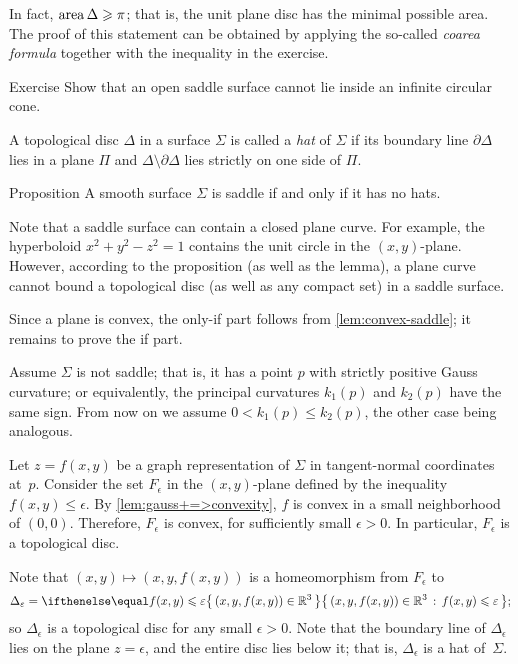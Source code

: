 In fact, $\mathop{\rm area}\nolimits \Delta\geqslant \pi$;
that is, the unit plane disc has the minimal possible area.
The proof of this statement can be obtained by applying the so-called \emph{coarea formula} together with the inequality in the exercise. 

\begin{thm}{Exercise}\label{ex:circular-cone-saddle}
Show that an open saddle surface
cannot lie inside an infinite circular cone. 
\end{thm}

A topological disc $\Delta$ in a surface $\Sigma$ is called a \emph{hat} of $\Sigma$
if its boundary line $\partial\Delta$ lies in a plane $\Pi$ and $\Delta \setminus \partial \Delta$ lies strictly on one side of $\Pi$.

\begin{thm}{Proposition}\label{prop:hat}
A smooth surface $\Sigma$ is saddle if and only if it has no hats.
\end{thm}

Note that a saddle surface can contain a closed plane curve.
For example, the hyperboloid $x^2+y^2-z^2=1$ contains the unit circle in the $(x,y)$-plane.
However, according to the proposition (as well as the lemma), a plane curve cannot bound a topological disc (as well as any compact set) in a saddle surface.

Since a plane is convex, the only-if part follows from \ref{lem:convex-saddle};
it remains to prove the if part.

Assume $\Sigma$ is not saddle; that is, it has a point $p$ with strictly positive Gauss curvature;
or equivalently, the principal curvatures $k_1(p)$ and $k_2(p)$ have the same sign. From now on we assume $0 < k_1 (p) \leq k_2 (p) $, the other case being analogous.


Let $z=f(x,y)$ be a graph representation of $\Sigma$ in tangent-normal coordinates at~$p$.
Consider the set $F_\epsilon$ in the $(x,y)$-plane defined by the inequality $f(x,y)\le \epsilon$.
By \ref{lem:gauss+=>convexity}, $f$ is convex in a small neighborhood of $(0,0)$.
Therefore, $F_\epsilon$ is convex, for sufficiently small $\epsilon>0$.
In particular, $F_\epsilon$ is a topological disc.

Note that $(x,y)\mapsto (x,y,f(x,y))$ is a homeomorphism from $F_\epsilon$
to
\[\Delta_\epsilon=\set{(x,y,f(x,y))\in \mathbb{R}^3}{f(x,y)\le \epsilon};\]
so $\Delta_\epsilon$ is a topological disc for any small $\epsilon>0$.
Note that the boundary line of $\Delta_\epsilon$ lies on the plane $z=\epsilon$, and the entire disc lies below it;
that is, $\Delta_\epsilon$ is a hat of~$\Sigma$.
\qeds

